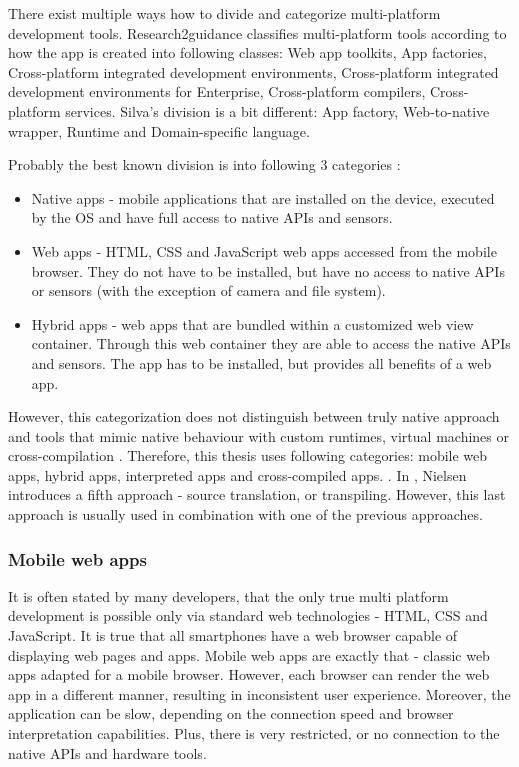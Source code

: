 \documentclass[english,master,public,dept460,male,cpdeclaration,oneside]{diploma}
\begin{document}
There exist multiple ways how to divide and categorize multi-platform development tools. Research2guidance \cite{cptBenchmarking2014} classifies multi-platform tools according to how the app is created into following classes: Web app toolkits, App factories, Cross-platform integrated development environments, Cross-platform integrated development environments for Enterprise, Cross-platform compilers, Cross-platform services. Silva’s division \cite{ribeiroDaSilva} is a bit different: App factory, Web-to-native wrapper, Runtime and Domain-specific language.

Probably the best known division is into following 3 categories \cite{aComparativeStudy} \cite{smutny} \cite{taxonomyCP}:
\begin{itemize}
	\item Native apps - mobile applications that are installed on the device, executed by the OS and have full access to native APIs and sensors.
	\item Web apps - HTML, CSS and JavaScript web apps accessed from the mobile browser. They do not have to be installed, but have no access to native APIs or sensors (with the exception of camera and file system).
	\item Hybrid apps - web apps that are bundled within a customized web view container. Through this web container they are able to access the native APIs and sensors. The app has to be installed, but provides all benefits of a web app.
\end{itemize}

However, this categorization does not distinguish between truly native approach and tools that mimic native behaviour with custom runtimes, virtual machines or cross-compilation \cite{definingTelerik}. Therefore, this thesis uses following categories: mobile web apps, hybrid apps, interpreted apps and cross-compiled apps. \cite{uppsala}\cite{rajTolety}\cite{evaluationOfCP}. In \cite{aarhus}, Nielsen introduces a fifth approach - source translation, or transpiling. However, this last approach is usually used in combination with one of the previous approaches.

\subsubsection{Mobile web apps}
It is often stated by many developers, that the only true multi platform development is possible only via standard web technologies - HTML, CSS and JavaScript. It is true that all smartphones have a web browser capable of displaying web pages and apps. Mobile web apps are exactly that - classic web apps adapted for a mobile browser. However, each browser can render the web app in a different manner, resulting in inconsistent user experience. Moreover, the application can be slow, depending on the connection speed and browser interpretation capabilities. Plus, there is very restricted, or no connection to the native APIs and hardware tools.
\end{document}

